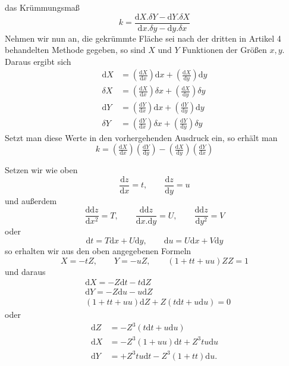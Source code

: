 %
das Krümmungsmaß
\[
k=\frac{\mathrm{d}X\mathord{.}\delta Y-\mathrm{d}Y\mathord{.}\delta X}{\mathrm{d}x\mathord{.}\delta y-\mathrm{d}y\mathord{.}\delta x}
\]
Nehmen wir nun an, die gekrümmte Fläche sei nach der dritten in Artikel 4 behandelten Methode gegeben, so sind \(X\) und \(Y\) Funktionen der Größen \(x,y\). Daraus ergibt sich
\[
\begin{aligned}
\mathrm{d}X&=(\tfrac{\mathrm{d}X}{\mathrm{d}x})\mathrm{d}x+(\tfrac{\mathrm{d}X}{\mathrm{d}y})\mathrm{d}y\\
\delta X&=(\tfrac{\mathrm{d}X}{\mathrm{d}x})\delta x+(\tfrac{\mathrm{d}X}{\mathrm{d}y})\delta y\\
\mathrm{d}Y&=(\tfrac{\mathrm{d}Y}{\mathrm{d}x})\mathrm{d}x+(\tfrac{\mathrm{d}Y}{\mathrm{d}y})\mathrm{d}y\\
\delta Y&=(\tfrac{\mathrm{d}Y}{\mathrm{d}x})\delta x+(\tfrac{\mathrm{d}Y}{\mathrm{d}y})\delta y
\end{aligned}
\]
Setzt man diese Werte in den vorhergehenden Ausdruck ein, so erhält man
\[
k=(\tfrac{\mathrm{d}X}{\mathrm{d}x})(\tfrac{\mathrm{d}Y}{\mathrm{d}y})-(\tfrac{\mathrm{d}X}{\mathrm{d}y})(\tfrac{\mathrm{d}Y}{\mathrm{d}x})
\]
\par\indent Setzen wir wie oben
\[
\frac{\mathrm{d}z}{\mathrm{d}x}=t,\qquad\frac{\mathrm{d}z}{\mathrm{d}y}=u
\]
und außerdem
\[
\frac{\mathrm{d}\mathrm{d}z}{\mathrm{d}x^2}=T,\qquad\frac{\mathrm{d}\mathrm{d}z}{\mathrm{d}x\mathord{.}\mathrm{d}y}=U,\qquad\frac{\mathrm{d}\mathrm{d}z}{\mathrm{d}y^2}=V
\]
oder
\[
\mathrm{d}t=T\mathrm{d}x+U\mathrm{d}y,\qquad\mathrm{d}u=U\mathrm{d}x+V\mathrm{d}y
\]
so erhalten wir aus den oben angegebenen Formeln
\[
X=-tZ,\qquad Y=-uZ,\qquad(1+tt+uu)ZZ=1
\]
und daraus
\[
\begin{aligned}
&\mathrm{d}X=-Z\mathrm{d}t-t\mathrm{d}Z\\
&\mathrm{d}Y=-Z\mathrm{d}u-u\mathrm{d}Z\\
&(1+tt+uu)\mathrm{d}Z+Z(t\mathrm{d}t+u\mathrm{d}u)=0
\end{aligned}
\]
oder
\[
\begin{aligned}
\mathrm{d}Z&=-Z^3(t\mathrm{d}t+u\mathrm{d}u)\\
\mathrm{d}X&=-Z^3(1+uu)\mathrm{d}t+Z^3tu\mathrm{d}u\\
\mathrm{d}Y&=+Z^3tu\mathrm{d}t-Z^3(1+tt)\mathrm{d}u\mathord{.}
\end{aligned}
\]
